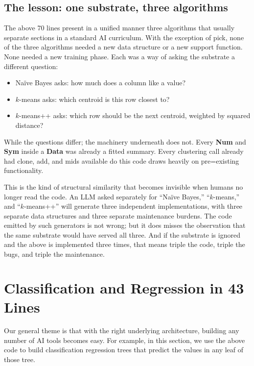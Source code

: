 \documentclass[AMA,STIX2COL]{WileyNJDv5}
\newcommand{\cls}[1]{%
  \setlength{\fboxsep}{1.5pt}%
  \colorbox{clsbg}{\sffamily\bfseries{#1}}%
}
\begin{document}
{\subsection*{The lesson: one substrate, three algorithms}
The above 70 lines present in a unified manner three algorithms that
usually separate sections in a standard AI curriculum.
With the exception of \textsf{pick},
none of the three algorithms needed a new data structure or a
new support function. None needed a new training phase. Each was
a way of asking the substrate a different question:

\begin{itemize}
\item Naïve Bayes asks: how much does a column like a value?
\item $k$-means asks: which centroid is this row closest to?
\item $k$-means++ asks: which row should be the next centroid,
weighted by squared distance?
\end{itemize}
While the questions differ; the machinery underneath does not. Every
\cls{Num} and \cls{Sym} inside a \cls{Data} was already a fitted
summary. Every clustering call already had \textsf{clone},
\textsf{add}, and \textsf{mids} available do this code draws heavily on
pre=existing functionality.

This is the kind of structural similarity that becomes invisible
when humans no longer read the code. An LLM asked separately for
``Naïve Bayes,'' ``$k$-means,'' and ``$k$-means++'' will
generate three independent implementations, with three separate
data structures and three separate maintenance burdens. The
code emitted by such generators is not wrong;
but it does  misses the observation that the same substrate would
have served all three. And if the substrate is ignored and the above
is implemented three times, that  means
triple the code, triple the bugs,  and triple the maintenance. 


  \section{ Classification and Regression in 43 Lines}\label{trees}

 

 Our general theme is that with the right underlying
 architecture, building any number of AI tools becomes
 easy.
For example, in this section, we use the above code to build
classification 
 regression trees that predict the   values in any leaf of those tree.
 
}
\end{document}
